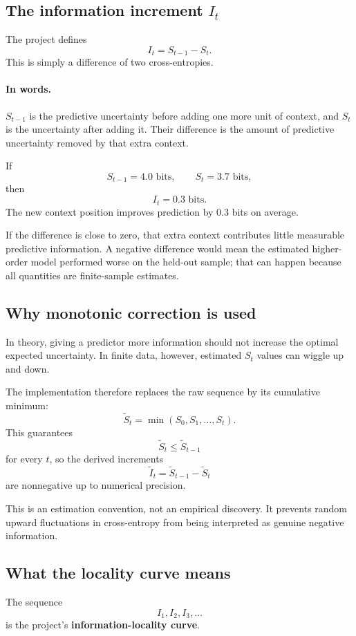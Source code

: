 \documentclass[11pt]{article}
\begin{document}
\subsection{The information increment $I_t$}
The project defines
\[
\boxed{I_t=S_{t-1}-S_t.}
\]
This is simply a difference of two cross-entropies.

\paragraph{In words.}
$S_{t-1}$ is the predictive uncertainty before adding one more unit of context, and $S_t$ is the uncertainty after adding it. Their difference is the amount of predictive uncertainty removed by that extra context.

If
\[
S_{t-1}=4.0\text{ bits},\qquad S_t=3.7\text{ bits},
\]
then
\[
I_t=0.3\text{ bits}.
\]
The new context position improves prediction by 0.3 bits on average.

If the difference is close to zero, that extra context contributes little measurable predictive information. A negative difference would mean the estimated higher-order model performed worse on the held-out sample; that can happen because all quantities are finite-sample estimates.

\subsection{Why monotonic correction is used}
In theory, giving a predictor more information should not increase the optimal expected uncertainty. In finite data, however, estimated $S_t$ values can wiggle up and down.

The implementation therefore replaces the raw sequence by its cumulative minimum:
\[
\tilde S_t=\min(S_0,S_1,\ldots,S_t).
\]
This guarantees
\[
\tilde S_t\le \tilde S_{t-1}
\]
for every $t$, so the derived increments
\[
\tilde I_t=\tilde S_{t-1}-\tilde S_t
\]
are nonnegative up to numerical precision.

This is an estimation convention, not an empirical discovery. It prevents random upward fluctuations in cross-entropy from being interpreted as genuine negative information.

\subsection{What the locality curve means}
The sequence
\[
I_1,I_2,I_3,\ldots
\]
is the project's \textbf{information-locality curve}.
\end{document}
